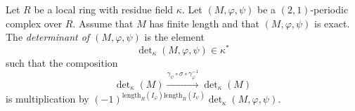 \begin{definition}
\label{definition-periodic-determinant}
Let $R$ be a local ring with residue field $\kappa$.
Let $(M, \varphi, \psi)$ be a $(2, 1)$-periodic complex over $R$.
Assume that $M$ has finite length and that $(M, \varphi, \psi)$ is
exact. The {\it determinant of $(M, \varphi, \psi)$} is
the element
$$
\det\nolimits_\kappa(M, \varphi, \psi) \in \kappa^*
$$
such that the composition
$$
\det\nolimits_\kappa(M)
\xrightarrow{\gamma_\psi \circ \sigma \circ \gamma_\varphi^{-1}}
\det\nolimits_\kappa(M)
$$
is multiplication by
$(-1)^{\text{length}_R(I_\varphi)\text{length}_R(I_\psi)}
\det\nolimits_\kappa(M, \varphi, \psi)$.
\end{definition}